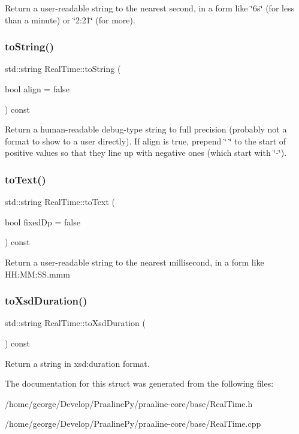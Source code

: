 Return a user-\/readable string to the nearest second, in a form like \char`\"{}6s\char`\"{} (for less than a minute) or \char`\"{}2\+:21\char`\"{} (for more). \mbox{\label{struct_real_time_a14de8a0e61b2c5fdca62cd0c7c69130f}} 
\subsubsection{\texorpdfstring{to\+String()}{toString()}}
{\footnotesize\ttfamily std\+::string Real\+Time\+::to\+String (\begin{DoxyParamCaption}\item[{bool}]{align = {\ttfamily false} }\end{DoxyParamCaption}) const}

Return a human-\/readable debug-\/type string to full precision (probably not a format to show to a user directly). If align is true, prepend \char`\"{} \char`\"{} to the start of positive values so that they line up with negative ones (which start with \char`\"{}-\/\char`\"{}). \mbox{\label{struct_real_time_a5696e68ee181c45d25620e51c134d283}} 
\subsubsection{\texorpdfstring{to\+Text()}{toText()}}
{\footnotesize\ttfamily std\+::string Real\+Time\+::to\+Text (\begin{DoxyParamCaption}\item[{bool}]{fixed\+Dp = {\ttfamily false} }\end{DoxyParamCaption}) const}

Return a user-\/readable string to the nearest millisecond, in a form like H\+H\+:\+MM\+:S\+S.\+mmm \mbox{\label{struct_real_time_ab21fab249ec4d6264dcc18cbe1f1e343}} 
\subsubsection{\texorpdfstring{to\+Xsd\+Duration()}{toXsdDuration()}}
{\footnotesize\ttfamily std\+::string Real\+Time\+::to\+Xsd\+Duration (\begin{DoxyParamCaption}{ }\end{DoxyParamCaption}) const}

Return a string in xsd\+:duration format. 

The documentation for this struct was generated from the following files\+:\begin{DoxyCompactItemize}
\item 
/home/george/\+Develop/\+Praaline\+Py/praaline-\/core/base/Real\+Time.\+h\item 
/home/george/\+Develop/\+Praaline\+Py/praaline-\/core/base/Real\+Time.\+cpp\end{DoxyCompactItemize}
